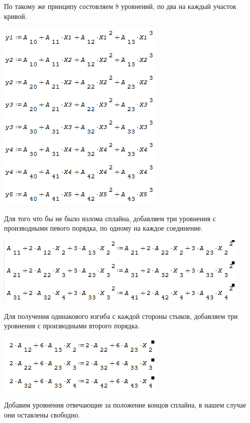 \documentclass[russian,utf8,nocolumnxxxi,nocolumnxxxii]{eskdtext}
\begin{document}
{\par
\normalsize По такому же принципу состовляем 8 уровнений, по два на каждый участок кривой.
\begin{center}\includegraphics[scale=0.8]{2019-01-09_03-19-11}\end{center}
\par
\newpage
\normalsize
Для того что бы не было излома сплайна, добавляем три уровнения с производными певого порядка, по одному на каждое соединение.
\begin{center}\includegraphics[scale=0.8]{2019-01-09_03-26-45}\end{center}
\par
\normalsize
Для получения одинакового изгиба с каждой стороны стыков, добавляем три уровнения с производными второго порядка.
\begin{center}\includegraphics[scale=0.8]{2019-01-09_03-31-08}\end{center}
\par
\normalsize
Добавим уровнения отвечающие за положение концов сплайна, в нашем случае они оставлены свободно.
}
\end{document}
